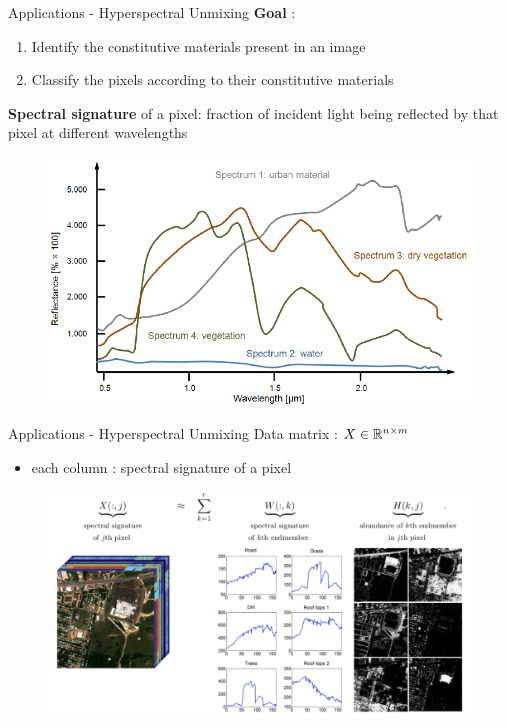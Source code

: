 \begin{frame}{Applications - Hyperspectral Unmixing}
    \textbf{Goal} :
    \begin{enumerate}
        \item Identify the constitutive materials present in an image
        \item Classify the pixels according to their constitutive materials
    \end{enumerate}
    \vspace{1cm}
    \textbf{Spectral signature} of a pixel: fraction of incident light being reflected by that pixel at different wavelengths\\
    \begin{figure}
        \centering
        \includegraphics[width=0.65\linewidth]{../images/Spectral-signatures.png}
    \end{figure}
\end{frame}

\begin{frame}{Applications - Hyperspectral Unmixing}
    Data matrix : $X\in\mathbb{R}^{n\times m}$\\
    \begin{itemize}
        \item each column : spectral signature of a pixel
    \end{itemize}
    \begin{figure}
        \centering
        \includegraphics[width=0.85\linewidth]{../images/NMF_app3.png}
    \end{figure}
\end{frame}

